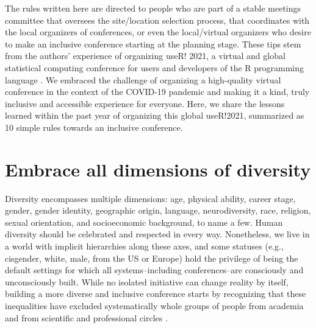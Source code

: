 \documentclass[10pt,letterpaper]{article}
\begin{document}
The rules written here are directed to people who are part of a stable meetings committee that oversees the site/location selection process, that coordinates with the local organizers of conferences, or even the local/virtual organizers who desire to make an inclusive conference starting at the planning stage.
These tips stem from the authors' experience of organizing useR! 2021, a virtual and global statistical computing conference for users and developers of the R programming language \cite{r_core_team_2021}. 
We embraced the challenge of organizing a high-quality virtual conference in the context of the COVID-19 pandemic and making it a kind, truly inclusive and accessible experience for everyone. 
Here, we share the lessons learned within the past year of organizing this global useR!2021, summarized as 10 simple rules towards an inclusive conference.



\section{Embrace all dimensions of diversity}
\label{rule_diversity}

Diversity encompasses multiple dimensions: age, physical ability, career stage, gender, gender identity, geographic origin, language, neurodiversity, race, religion, sexual orientation, and socioeconomic background, to name a few. 
Human diversity should be celebrated and respected in every way. Nonetheless, we live in a world with implicit hierarchies along these axes, and some statuses (e.g., cisgender, white, male, from the US or Europe) hold the privilege of being the default settings for which all systems--including conferences--are consciously and unconsciously built.  
While no isolated initiative can change reality by itself, building a more diverse and inclusive conference starts by recognizing that these inequalities have excluded systematically whole groups of people from academia and from scientific and professional circles \cite{timperleyHeMoanaPukepuke2020}. 
\end{document}
